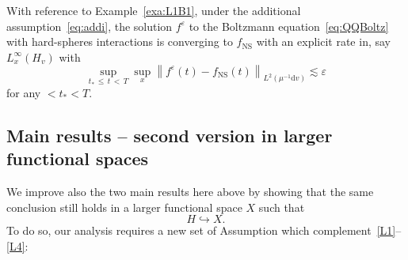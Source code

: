 \documentclass[AHL,Unicode,longabstracts,published]{cedram}
\newcommand{\ns}{\mathrm{NS}}
\renewcommand{\d}{\mathrm{d}}
\newcommand{\Ss}{H}
\newcommand{\Sl}{X}
\renewcommand*\le{\leqslant}
\newcommand*\eps{{\varepsilon}}
\begin{document}
\begin{exem}\label{exe:rate}
With reference to Example~\ref{exa:L1B1}, under the additional assumption~\eqref{eq:addi}, the solution $f^{\eps}$ to the Boltzmann equation~\eqref{eq:QQBoltz} with hard-spheres interactions is converging to $f_\ns$ with an explicit rate in, say $L^{\infty}_{x}(\Ss_{v})$ with
\[
\sup_{t_*\,\le\,t\,<\,T} \sup_{x} \left\| f^\eps(t) - f_\ns(t) \right\|_{ L^2\left(\mu^{-1}\d v\right) } \lesssim \eps
\]
for any $< t_* < T.$
\end{exem}



\subsection{Main results -- second version in larger functional spaces}

We improve also the two main results here above by showing that the same conclusion still holds in a larger functional space $\Sl$ such that
\[
\Ss \hookrightarrow \Sl.
\]
To do so, our analysis requires a new set of Assumption which complement~\eqref{L1}--\eqref{L4}:
\end{document}
